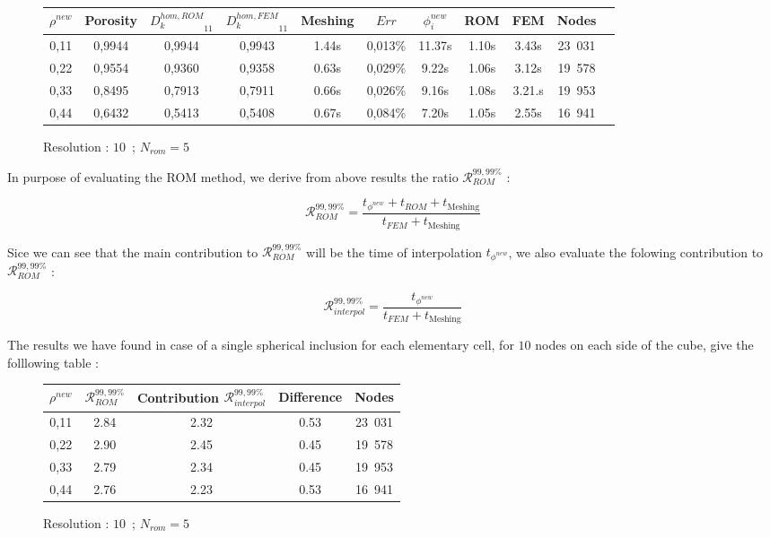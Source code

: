 {\etoile%

\begin{figure}[H]%
%
\begin{center}
\begin{tabular}{|c|c||c|c||c||c|c||c|c||c||c|}
\hline
\rowcolor{lightgray} $\rho^{new}$&Porosity&${D_k^{hom,ROM}}_{11}$&${D_k^{hom,FEM}}_{11}$&Meshing&$Err$&$\phi_i^{new}$&ROM&FEM&Nodes\\
\hline
0,11&0,9944&0,9944&0,9943&1.44s&0,013\%&11.37s&1.10s&3.43s&23\ 031\\
\hline
0,22&0,9554&0,9360&0,9358&0.63s&0,029\%&9.22s&1.06s&3.12s&19\ 578\\
\hline
0,33&0,8495&0,7913&0,7911&0.66s&0,026\%&9.16s&1.08s&3.21.s&19\ 953\\
\hline
0,44&0,6432&0,5413&0,5408&0.67s&0,084\%&7.20s&1.05s&2.55s&16\ 941\\
\hline
\end{tabular}
\end{center}
\caption{Resolution : $10$\ ; $N_{rom}=5$}
%
\end{figure}

In purpose of evaluating the ROM method, we derive from above results the ratio $\mathcal{R}_{ROM}^{99,99\%}$ :

\begin{equation}
\label{eval_rom}
\mathcal{R}_{ROM}^{99,99\%}=\dfrac{t_{\phi^{new}}+t_{ROM}+t_{\text{Meshing}}}{t_{FEM}+t_{\text{Meshing}}}
\end{equation}

Sice we can see that the main contribution to $\mathcal{R}_{ROM}^{99,99\%}$ will be the time of interpolation $t_{\phi^{new}}$, %
we also evaluate the folowing contribution to $\mathcal{R}_{ROM}^{99,99\%}$ :

\begin{equation}
\label{eval_interp}
\mathcal{R}_{interpol}^{99,99\%}=\dfrac{t_{\phi^{new}}}{t_{FEM}+t_{\text{Meshing}}}
\end{equation}

The results we have found in case of a single spherical inclusion for each elementary cell, for $10$ nodes on each side of the cube, give the folllowing table :

\begin{figure}[H]%
%
\begin{center}
\begin{tabular}{|c||c|c|c||c|}
\hline
\rowcolor{lightgray} $\rho^{new}$&$\mathcal{R}_{ROM}^{99,99\%}$&Contribution $\mathcal{R}_{interpol}^{99,99\%}$&Difference&Nodes\\
\hline
0,11&2.84&2.32&0.53&23\ 031\\
\hline
0,22&2.90&2.45&0.45&19\ 578\\
\hline
0,33&2.79&2.34&0.45&19\ 953\\
\hline
0,44&2.76&2.23&0.53&16\ 941\\
\hline
\end{tabular}
\end{center}
\caption{Resolution : $10$\ ; $N_{rom}=5$}
%
\end{figure}

}
